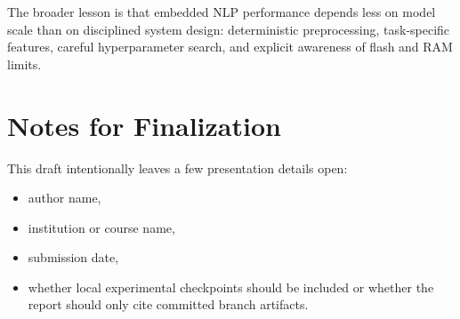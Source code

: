\documentclass[11pt,a4paper]{article}
\begin{document}
The broader lesson is that embedded NLP performance depends less on model scale than on disciplined system design: deterministic preprocessing, task-specific features, careful hyperparameter search, and explicit awareness of flash and RAM limits.

\section*{Notes for Finalization}

This draft intentionally leaves a few presentation details open:

\begin{itemize}
    \item author name,
    \item institution or course name,
    \item submission date,
    \item whether local experimental checkpoints should be included or whether the report should only cite committed branch artifacts.
\end{itemize}
\end{document}
